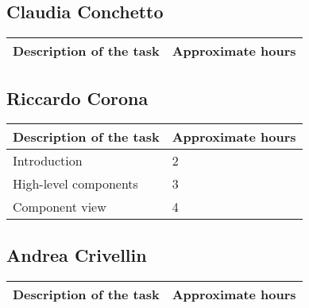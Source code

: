 
%

\subsection{Claudia Conchetto}
\begin{table}[h!]
\begin{tabular}{|l|l|}
\hline
\textbf{Description of the task} & \textbf{Approximate hours} \\ \hline
\end{tabular}
\end{table}

\subsection{Riccardo Corona}
\begin{table}[h!]
\begin{tabular}{|l|l|}
\hline
\textbf{Description of the task} & \textbf{Approximate hours} \\ \hline
Introduction & 2 \\ \hline
High-level components & 3 \\ \hline
Component view & 4 \\ \hline
\end{tabular}
\end{table}

\subsection{Andrea Crivellin}
\begin{table}[h!]
\begin{tabular}{|l|l|}
\hline
\textbf{Description of the task} & \textbf{Approximate hours} \\ \hline
\end{tabular}
\end{table}

%